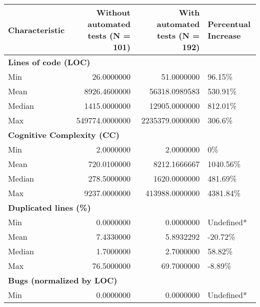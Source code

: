 \begin{table}
\centering
\begin{tabular}[t]{l|r|r|l}
\hline
\textbf{Characteristic} & \textbf{Without automated tests (N = 101)} & \textbf{With automated tests (N = 192)} & \textbf{Percentual Increase}\\
\hline
\multicolumn{4}{l}{\textbf{Lines of code (LOC)}}\\
\hline
\hspace{1em}Min & 26.0000000 & 51.0000000 & 96.15\%\\
\hline
\hspace{1em}Mean & 8926.4600000 & 56318.0989583 & 530.91\%\\
\hline
\hspace{1em}Median & 1415.0000000 & 12905.0000000 & 812.01\%\\
\hline
\hspace{1em}Max & 549774.0000000 & 2235379.0000000 & 306.6\%\\
\hline
\multicolumn{4}{l}{\textbf{Cognitive Complexity (CC)}}\\
\hline
\hspace{1em}Min & 2.0000000 & 2.0000000 & 0\%\\
\hline
\hspace{1em}Mean & 720.0100000 & 8212.1666667 & 1040.56\%\\
\hline
\hspace{1em}Median & 278.5000000 & 1620.0000000 & 481.69\%\\
\hline
\hspace{1em}Max & 9237.0000000 & 413988.0000000 & 4381.84\%\\
\hline
\multicolumn{4}{l}{\textbf{Duplicated lines (\%)}}\\
\hline
\hspace{1em}Min & 0.0000000 & 0.0000000 & \vphantom{3} Undefined*\\
\hline
\hspace{1em}Mean & 7.4330000 & 5.8932292 & -20.72\%\\
\hline
\hspace{1em}Median & 1.7000000 & 2.7000000 & 58.82\%\\
\hline
\hspace{1em}Max & 76.5000000 & 69.7000000 & -8.89\%\\
\hline
\multicolumn{4}{l}{\textbf{Bugs (normalized by LOC)}}\\
\hline
\hspace{1em}Min & 0.0000000 & 0.0000000 & \vphantom{2} Undefined*\\

\end{tabular}
\end{table}
